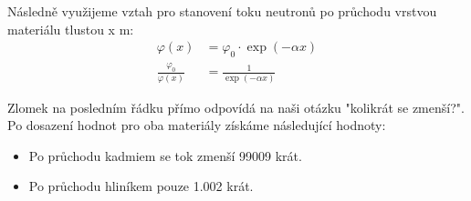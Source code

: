 Následně využijeme vztah pro stanovení toku neutronů po průchodu vrstvou materiálu tlustou x m:
\begin{align*}
    \varphi(x) &= \varphi_{0} \cdot \exp(-\alpha x)\\
    \frac{\varphi_{0}}{\varphi(x)} &=\frac{1}{\exp(-\alpha x)}
\end{align*}

Zlomek na posledním řádku přímo odpovídá na naši otázku "kolikrát se zmenší?". Po dosazení hodnot pro oba materiály získáme následující hodnoty:
\begin{itemize}
    \item Po průchodu kadmiem se tok zmenší \num{99009} krát. 
    \item Po průchodu hliníkem pouze \num{1,002} krát.
\end{itemize}





